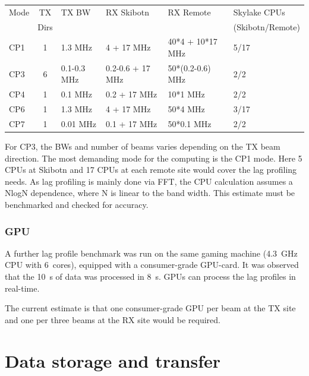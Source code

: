 \documentclass[12pt,a4paper]{article}
\begin{document}
\begin{center}
\begin{tabular}{lcllll}
{Mode}&{TX}&{TX BW}&{RX Skibotn}&{RX Remote} & {Skylake CPUs} \\
 & {Dirs} & & &  & {(Skibotn/Remote)} \\
                CP1 & 1 & 1.3 MHz & 4 + 17 MHz & 40*4 + 10*17 MHz & 5/17\\
                CP3 & 6 & 0.1-0.3 MHz & 0.2-0.6 + 17 MHz & 50*(0.2-0.6) MHz & 2/2\\
                CP4 & 1 & 0.1 MHz & 0.2 + 17 MHz & 10*1 MHz & 2/2\\
                CP6 & 1 & 1.3 MHz & 4 + 17 MHz & 50*4 MHz & 3/17 \\
                CP7 & 1 & 0.01 MHz & 0.1 + 17 MHz & 50*0.1 MHz & 2/2 \\
\end{tabular}
\end{center}               

For CP3, the BWs and number of beams varies depending on the TX beam direction. 
The most demanding mode for the computing is the CP1 mode. Here 5 CPUs at Skibotn and 17 CPUs at each remote site would cover the lag profiling needs. 
As lag profiling is mainly done via FFT, the CPU calculation assumes a NlogN dependence, where N is linear to the band width.
This estimate must be benchmarked and checked for accuracy.


\subsubsection{GPU}

A further lag profile benchmark was run on the same gaming machine (4.3~GHz CPU with 6~cores), equipped with a consumer-grade GPU-card.
It was observed that the 10~s of data was processed in 8~s.
GPUs can process the \NBW lag profiles in real-time.

The current estimate is that one consumer-grade GPU per beam at the TX site and one per three beams at the RX site would be required.

\section{Data storage and transfer}
\label{sec:storage}
\end{document}
